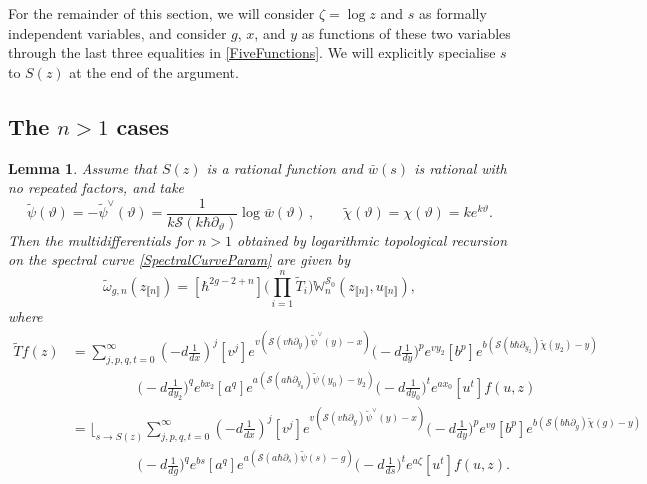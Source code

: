 \documentclass[10pt,a4paper,oneside,no-math,reqno]{amsart}%
\theoremstyle{plain}
\newtheorem{lemma}[theorem]{Lemma}
\theoremstyle{definition}
\theoremstyle{remark}
\numberwithin{equation}{section}
\renewcommand{\theta}{\vartheta}
\newcommand{\mb}[1]{\mathbb{#1}}
\newcommand{\mc}[1]{\mathcal{#1}}
\newcommand{\1}{\mathds{1}}
\newcommand{\<}{\langle}
\renewcommand{\>}{\rangle}
\newcommand{\del}{\partial}
\begin{document}
For the remainder of this section, we will consider $ \zeta = \log z$ and $ s$ as formally independent variables, and consider $ g$, $ x$, and $ y$ as functions of these two variables through the last three equalities in \cref{FiveFunctions}. We will explicitly specialise $ s$ to $ S(z)$ at the end of the argument.



\subsection{The \texorpdfstring{$ n > 1$}{n>1} cases}


\begin{lemma}\label{DualitiesPreserveTR}
	Assume that $ S(z)$ is a rational function and $ \bar{w}(s)$ is rational with no repeated factors, and take
	\begin{equation}\label{TransformationDeformations}
		\tilde{\psi} ( \theta )
		=
		- \tilde{\psi}^\vee (\theta)
		=
		\frac{1}{k \mc{S}( k \hbar \del_\theta )} \log \bar{w}(\theta )
		\,,
		\qquad
		\tilde{\chi} (\theta )
		=
		\chi (\theta )
		=
		k e^{k \theta} .
	\end{equation}
	Then the multidifferentials for $ n > 1$ obtained by logarithmic topological recursion on the spectral curve \cref{SpectralCurveParam} are given by
	\begin{equation}
		\tilde{\omega}_{g,n} (z_{\llbracket n\rrbracket}) 
		=
		[\hbar^{2g-2+n}] \Big( \prod_{i=1}^n \tilde{T}_i \Big) \mb{W}_n^{\mc{S}_0} (z_{\llbracket n\rrbracket}, u_{\llbracket n\rrbracket}) ,
	\end{equation}
	where
	\begin{equation}
	\begin{split}
		\tilde{T} f (z)
		&=
		\sum_{j,p,q,t=0}^\infty (-d \frac{1}{dx})^j [v^j] 
		e^{v ( \mc{S}(v\hbar \del_{y}) \tilde{\psi}^\vee (y) - x )} \big( -d \frac{1}{dy} \big)^p e^{vy_2} [b^p ]
		e^{b ( \mc{S}(b \hbar \del_{y_2}) \tilde{\chi}(y_2) - y )} 
		\\
		&\hspace{2cm}
		\big( -d \frac{1}{dy_2} \big)^q e^{bx_2} [a^q ]
		e^{a ( \mc{S}(a\hbar \del_{y_0}) \tilde{\psi}(y_0) - y_2 )} \big( -d \frac{1}{dy_0} \big)^t e^{ax_0} [u^t ]
		f(u,z)
		\\
		&=
		\Big\lfloor_{s \to S(z)} \sum_{j,p,q,t=0}^\infty (-d \frac{1}{dx})^j [v^j] 
		e^{v ( \mc{S}(v\hbar \del_{y}) \tilde{\psi}^\vee(y) - x )} \big( -d \frac{1}{dy} \big)^p e^{vg} [b^p ]
		e^{b ( \mc{S}(b\hbar \del_g) \tilde{\chi}(g) - y )}
		\\
		&\hspace{2cm}
		\big( -d \frac{1}{dg} \big)^q e^{bs} [a^q ]
		e^{a ( \mc{S}(a\hbar \del_{s}) \tilde{\psi}(s) - g )} \big( -d \frac{1}{ds} \big)^t e^{a\zeta} [u^t ]
		f(u,z) .
	\end{split}
	\end{equation}
\end{lemma}
\end{document}
